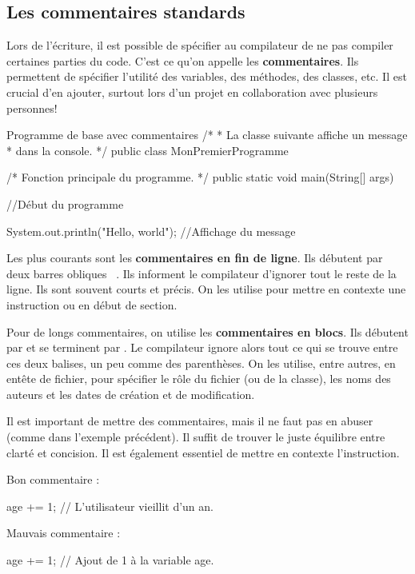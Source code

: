 \documentclass[12pt]{report}
\newcommand{\commande}[1]{%
\tcbox[on line, size=fbox, colframe=black, boxrule=0.75pt, tcbox raise base]{#1} %
}
\begin{document}
\subsection{Les commentaires standards}
%
%
Lors de l'écriture, il est possible de spécifier au compilateur de ne pas compiler certaines parties du code. C'est ce qu'on appelle les \textbf{commentaires}. Ils permettent de spécifier l'utilité des variables, des méthodes, des classes, etc. Il est crucial d'en ajouter, surtout lors d'un projet en collaboration avec plusieurs personnes!

%
%
\begin{MyTCB}{Programme de base avec commentaires}
/* 
 * La classe suivante affiche un message
 * dans la console.
 */
public class MonPremierProgramme {

	/*  Fonction principale
		du programme.		*/
	public static void main(String[] args) {
	
		//Début du programme
		
		System.out.println("Hello, world"); //Affichage du message
		
	}
	
}
\end{MyTCB}
%
%
Les plus courants sont les \textbf{commentaires en fin de ligne}. Ils débutent par deux barres obliques \mbox{\commande{//}.} Ils informent le compilateur d'ignorer tout le reste de la ligne. Ils sont souvent courts et précis. On les utilise pour mettre en contexte une instruction ou en début de section.

Pour de longs commentaires, on utilise les \textbf{commentaires en blocs}. Ils débutent par \commande{/*} et se terminent par \commande{*/}. Le compilateur ignore alors tout ce qui se trouve entre ces deux balises, un peu comme des parenthèses. On les utilise, entre autres, en entête de fichier, pour spécifier le rôle du fichier (ou de la classe), les noms des auteurs et les dates de création et de modification.

Il est important de mettre des commentaires, mais il ne faut pas en abuser (comme dans l'exemple précédent). Il suffit de trouver le juste équilibre entre clarté et concision. Il est également essentiel de mettre en contexte l'instruction.

Bon commentaire :
\begin{code}
age += 1; // L'utilisateur vieillit d'un an.
\end{code}

Mauvais commentaire :
\begin{code}
age += 1; // Ajout de 1 à la variable age.
\end{code}
\end{document}
